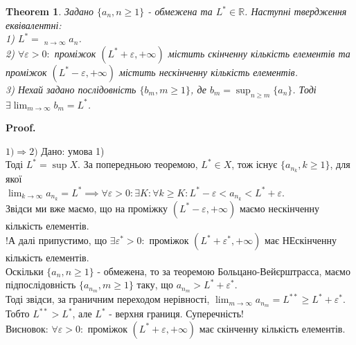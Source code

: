 \documentclass[a4paper, 14pt]{article}
\makeatletter
\DeclareMathOperator*\uplim{\overline{lim}}
\def\huge{\displaystyle}
\def\qed{$\blacksquare$}
\theoremstyle{theoremdd}
\newtheorem{theorem}{Theorem}[subsection]
\theoremstyle{theoremdd}
\theoremstyle{theoremdd}
\theoremstyle{theoremdd}
\theoremstyle{theoremdd}
\theoremstyle{theoremdd}
\theoremstyle{theoremdd}
\theoremstyle{theoremdd}
\renewenvironment{proof}[1][Proof.\\]{\par
\pushQED{\hfill \qed}%
\normalfont \topsep6\p@\@plus6\p@\relax
\trivlist
\item\relax
{\bfseries
#1\@addpunct{.}}\hspace\labelsep\ignorespaces
}{%
\popQED\endtrivlist\@endpefalse
}
\makeatother
\begin{document}
	\begin{theorem}
	Задано $\{a_n, n \geq 1\}$ - обмежена та $L^* \in \mathbb{R}$. Наступні твердження еквівалентні:\\
	1) $L^* = \huge \uplim_{n \to \infty} a_n$.\\
	2) $\forall \varepsilon > 0:$ проміжок $(L^*+\varepsilon, + \infty)$ містить скінченну кількість елементів та проміжок $(L^*-\varepsilon, + \infty)$ містить нескінченну кількість елементів.\\
	3) Нехай задано послідовність $\{b_m, m \geq 1\}$, де $b_m = \huge \sup_{n \geq m} \{a_n\}$. Тоді $\exists \huge \lim_{m \to \infty} b_m = L^*$.
	\end{theorem}
	
	\begin{proof}
	$\boxed{1) \Rightarrow 2)}$ Дано: умова 1)\\
	Тоді $L^* = \huge \sup X$. За попередньою теоремою, $L^* \in X$, тож існує $\{a_{n_k}, k \geq 1\}$, для якої \\ $\huge \lim_{k \to \infty} a_{n_k} = L^* \implies \forall \varepsilon > 0: \exists K: \forall k \geq K: L^*-\varepsilon < a_{n_k} < L^*+\varepsilon$.\\
	Звідси ми вже маємо, що на проміжку $(L^*-\varepsilon, +\infty)$ маємо нескінченну кількість елементів.\\
	!А далі припустимо, що $\exists \varepsilon^* > 0:$ проміжок $(L^*+\varepsilon^*, + \infty)$ має НЕскінченну кількість елементів.\\
	Оскільки $\{a_n, n \geq 1\}$ - обмежена, то за теоремою Больцано-Вейєрштрасса, маємо підпослідовність $\{a_{n_m}, m \geq 1\}$ таку, що $a_{n_m} > L^* + \varepsilon^*$.\\
	Тоді звідси, за граничним переходом нерівності, $\huge \lim_{m \to \infty} a_{n_m} = L^{**} \geq L^* + \varepsilon^*$. \\ 
	Тобто $L^{**} > L^*$, але $L^*$ - верхня границя. Суперечність!\\
	Висновок: $\forall \varepsilon > 0:$ проміжок $(L^*+\varepsilon, + \infty)$ має скінченну кількість елементів.
	\bigskip \\
	

\end{proof}
\end{document}

